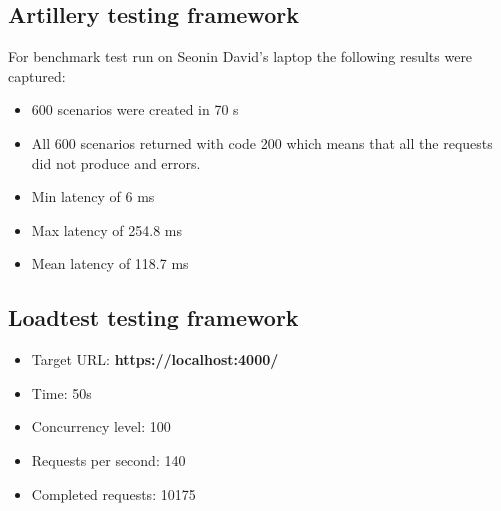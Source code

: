\documentclass[]{article}
\begin{document}
\subsection{Artillery testing framework}	
	For benchmark test run on Seonin David's laptop the following results were captured:
	\begin{itemize}
		\item 600 scenarios were created in 70 s
		\item All 600 scenarios returned with code 200 which means that all the requests did not produce and errors.
		\item Min latency of 6 ms
		\item Max latency of 254.8 ms
		\item Mean latency of 118.7 ms
	\end{itemize}

\subsection{Loadtest testing framework}
\begin{itemize}
	\item Target URL: \textbf{https://localhost:4000/}
	\item Time: 50s
	\item Concurrency level: 100
	\item Requests per second: 140
	\item Completed requests:  10175
\end{itemize}
\end{document}
